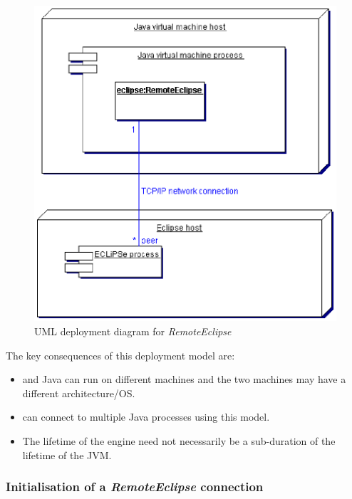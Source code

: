 \begin{center}
  \begin{figure}[htb]
    \begin{center}
        \includegraphics{embjava-diagrams/remote-deployment.eps}
    \end{center}
    \caption{\label{fig:ji-remote-deployment}UML deployment diagram for {\it RemoteEclipse}}
  \end{figure}
\end{center}

The key consequences of this deployment model are:
\begin{itemize}
\item {\eclipse} and Java can run on different machines and the two machines may have a different architecture/OS.  
\item {\eclipse} can connect to multiple Java processes using this model.
\item The lifetime of the {\eclipse} engine need not necessarily be a sub-duration of the lifetime of the JVM. 
\end{itemize}


\subsubsection{Initialisation of a {\it RemoteEclipse} connection}
\label{sec:ji-remote-init}

